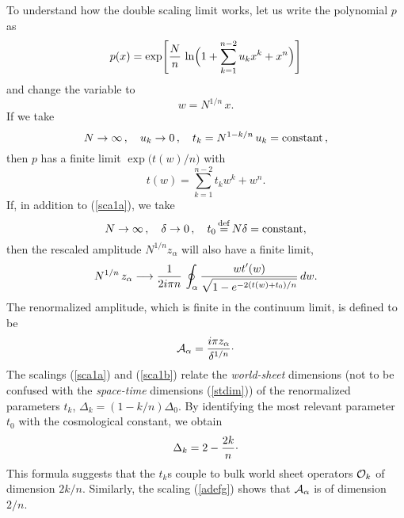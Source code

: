\documentclass[a4paper,12pt]{article}
\begin{document}
{To understand how the double scaling limit works, let us write the 
polynomial $p$ as
%
\begin{equation}
\label{plog}
p(x) = \exp \Biggl[ {N\over n}\, \ln \Bigl( 1+\sum_{k=1}^{n-2} u_{k}x^{k} + 
x^{n}\Bigr)\Biggr]
\end{equation}
%
and change the variable to
%
\begin{equation}
\label{wdef}
w = N^{1/n}\, x.
\end{equation}
%
If we take
%
\begin{equation}
\label{sca1a}
N\rightarrow\infty\, ,\quad u_{k}\rightarrow 0\, ,\quad
t_{k} = N^{1-k/n}\,u_{k} = {\rm constant}\, ,
\end{equation}
%
then $p$ has a finite limit $\exp \bigl(t(w)/n\bigr)$ with
%
\begin{equation}
\label{tpoldef}
t(w) = \sum_{k=1}^{n-2}t_{k}w^{k} + w^{n}.
\end{equation}
%
If, in addition to (\ref{sca1a}), we take
%
\begin{equation}
\label{sca1b}
N\rightarrow\infty\, ,\quad\delta\rightarrow 0\, ,\quad
t_{0} \mathop{=}\limits ^{\rm def} N\delta = {\rm constant},
\end{equation}
%
then the rescaled amplitude $N^{1/n}z_{\alpha}$ will also have a finite limit,
%
\begin{equation}
\label{zlimit}
N^{1/n}\, z_{\alpha} \longrightarrow {1\over 2i\pi n}\,\oint_{\alpha}
{\displaystyle w t'(w)\over\displaystyle\sqrt{1-e^{-2(t(w)+ t_{0})/n}}}\, 
dw.
\end{equation}
%
The renormalized amplitude, which is finite in the continuum limit, is 
defined to be
%
\begin{equation}
\label{adefg}
{\cal A}_{\alpha} = {i\pi z_{\alpha}\over\delta^{1/n}}\cdotp
\end{equation}
%
The scalings (\ref{sca1a}) and (\ref{sca1b}) relate the 
{\it world-sheet} dimensions (not to be confused with the {\it space-time}
dimensions (\ref{stdim})) of the renormalized parameters $t_{k}$,
$\Delta_{k} = (1-k/n)\Delta_{0}$. By identifying the most relevant 
parameter $t_{0}$ with the cosmological constant, we obtain
%
\begin{equation}
\label{wsdim}
\Delta_{k} = 2-{2k\over n}\cdotp
\end{equation}
%
This formula suggests that the $t_{k}$s couple to bulk world sheet 
operators ${\cal O}_{k}$ of dimension $2k/n$.
Similarly, the scaling (\ref{adefg}) shows that ${\cal A}_{\alpha}$ is of 
dimension $2/n$.

}
\end{document}
